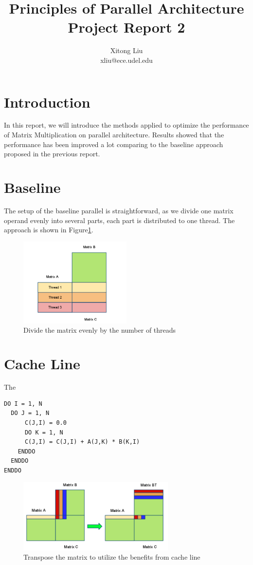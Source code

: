 \documentclass[12pt]{article}
\title{Principles of Parallel Architecture\\
Project Report 2}
\author{Xitong Liu \\
xliu@ece.udel.edu}
\begin{document}
\maketitle

\section{Introduction}
In this report, we will introduce the methods applied to optimize
the performance of Matrix Multiplication on parallel architecture.
Results showed that the performance has been improved a lot comparing
to the baseline approach proposed in the previous report.

\section{Baseline}
The setup of the baseline parallel is straightforward, as we divide
one matrix operand evenly into several parts, each part is distributed
to one thread. The approach is shown in Figure\ref{fig:matrix-divide}.

\begin{figure}[h!]
	\begin{center}
		\includegraphics[width=0.5\textwidth]{matrix-divide.png}
		\caption{\label{fig:matrix-divide}Divide the matrix 
			evenly by the number of threads}
	\end{center}
\end{figure}

\section{Cache Line}
The 
\begin{verbatim}
DO I = 1, N 
  DO J = 1, N
	  C(J,I) = 0.0 
      DO K = 1, N
      C(J,I) = C(J,I) + A(J,K) * B(K,I) 
    ENDDO
  ENDDO
ENDDO
\end{verbatim}
\begin{figure}[h!]
	\begin{center}
		\includegraphics[width=0.7\textwidth]{cacheline.png}
		\caption{\label{fig:cacheline}Transpose the matrix to utilize
		the benefits from cache line}
	\end{center}
\end{figure}
\end{document}
